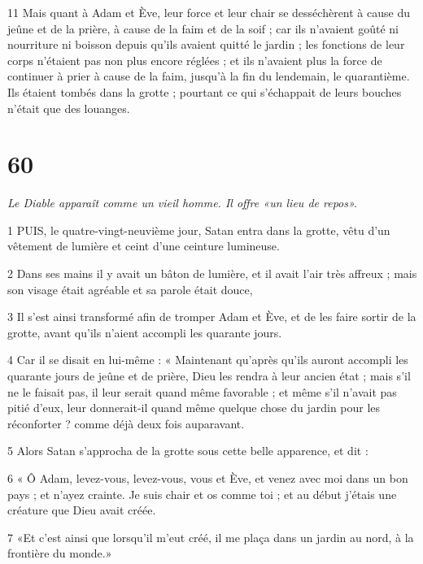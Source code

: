\par 11 Mais quant à Adam et Ève, leur force et leur chair se desséchèrent à cause du jeûne et de la prière, à cause de la faim et de la soif ; car ils n'avaient goûté ni nourriture ni boisson depuis qu'ils avaient quitté le jardin ; les fonctions de leur corps n'étaient pas non plus encore réglées ; et ils n'avaient plus la force de continuer à prier à cause de la faim, jusqu'à la fin du lendemain, le quarantième. Ils étaient tombés dans la grotte ; pourtant ce qui s'échappait de leurs bouches n'était que des louanges.

\chapter{60}

\par \textit{Le Diable apparaît comme un vieil homme. Il offre «un lieu de repos».}

\par 1 PUIS, le quatre-vingt-neuvième jour, Satan entra dans la grotte, vêtu d'un vêtement de lumière et ceint d'une ceinture lumineuse.

\par 2 Dans ses mains il y avait un bâton de lumière, et il avait l'air très affreux ; mais son visage était agréable et sa parole était douce,

\par 3 Il s'est ainsi transformé afin de tromper Adam et Ève, et de les faire sortir de la grotte, avant qu'ils n'aient accompli les quarante jours.

\par 4 Car il se disait en lui-même : « Maintenant qu'après qu'ils auront accompli les quarante jours de jeûne et de prière, Dieu les rendra à leur ancien état ; mais s’il ne le faisait pas, il leur serait quand même favorable ; et même s'il n'avait pas pitié d'eux, leur donnerait-il quand même quelque chose du jardin pour les réconforter ? comme déjà deux fois auparavant.

\par 5 Alors Satan s'approcha de la grotte sous cette belle apparence, et dit :

\par 6 « Ô Adam, levez-vous, levez-vous, vous et Ève, et venez avec moi dans un bon pays ; et n'ayez crainte. Je suis chair et os comme toi ; et au début j’étais une créature que Dieu avait créée.

\par 7 «Et c'est ainsi que lorsqu'il m'eut créé, il me plaça dans un jardin au nord, à la frontière du monde.»

